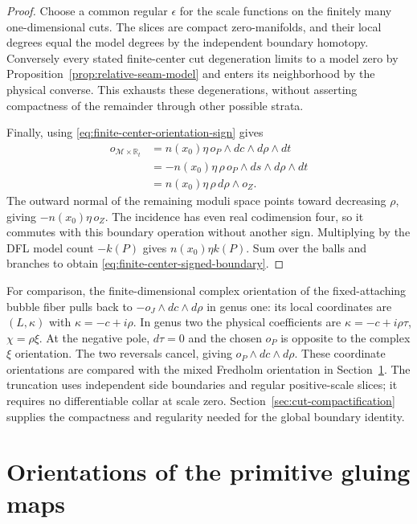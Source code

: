 \documentclass[11pt]{amsart}
\theoremstyle{definition}
\theoremstyle{remark}
\theoremstyle{plain}
\begin{document}
\begin{proof}
Choose a common regular $\epsilon$ for the scale functions
on the finitely many one-dimensional cuts. The slices are
compact zero-manifolds, and their local degrees equal the
model degrees by the independent boundary homotopy.
Conversely every stated finite-center cut degeneration
limits to a model zero by Proposition~\ref{prop:relative-seam-model}
and enters its neighborhood by the physical converse.
This exhausts these degenerations, without asserting
compactness of the remainder through other possible strata.

Finally, using \eqref{eq:finite-center-orientation-sign} gives
\begin{align*}
 o_{\mathcal M\times\mathbb R_t}
  &=n(x_0)\eta\,o_P\wedge dc\wedge d\rho\wedge dt\\
  &=-n(x_0)\eta\,\rho\,o_P\wedge ds\wedge d\rho\wedge dt\\
  &=n(x_0)\eta\,\rho\,d\rho\wedge o_Z .
\end{align*}
The outward normal of the remaining moduli space points
toward decreasing $\rho$, giving $-n(x_0)\eta\,o_Z$.
The incidence has even real codimension four, so it commutes
with this boundary operation without another sign.
Multiplying by the DFL model count $-k(P)$ gives
$n(x_0)\eta k(P)$. Sum over the balls and branches to obtain
\eqref{eq:finite-center-signed-boundary}.
\end{proof}

For comparison, the finite-dimensional complex orientation
of the fixed-attaching bubble fiber pulls back to
$-o_J\wedge dc\wedge d\rho$ in genus one:
its local coordinates are $(L,\kappa)$ with $\kappa=-c+i\rho$.
In genus two the physical coefficients are
$\kappa=-c+i\rho\tau$, $\chi=\rho\xi$.
At the negative pole, $d\tau=0$ and the chosen $o_P$ is
opposite to the complex $\xi$ orientation. The two reversals
cancel, giving $o_P\wedge dc\wedge d\rho$.
These coordinate orientations are compared with the mixed Fredholm
orientation in Section~\ref{sec:gluing-orientations}.
The truncation uses independent side boundaries and regular
positive-scale slices; it requires no differentiable collar at
scale zero. Section~\ref{sec:cut-compactification} supplies the
compactness and regularity needed for the global boundary identity.

\section{Orientations of the primitive gluing maps}
\label{sec:gluing-orientations}
\end{document}
